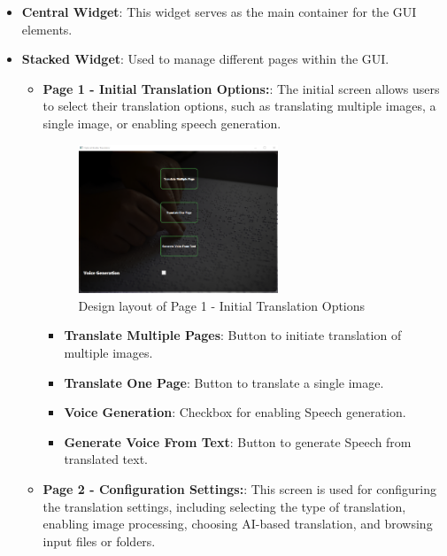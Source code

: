\begin{itemize}
    \item \textbf{Central Widget}: This widget serves as the main container for the GUI elements.
    
    \item \textbf{Stacked Widget}: Used to manage different pages within the GUI.
    
    \begin{itemize}
        \item \textbf{Page 1 - Initial Translation Options:}: The initial screen allows users to select their translation options, such as translating multiple images, a single image, or enabling speech generation.

        \begin{figure}[h!]
            \centering
            \includegraphics[width=0.6\textwidth]{main_page.png}
            \caption{Design layout of Page 1 - Initial Translation Options}
        \end{figure}
        
        \begin{itemize}
            \item \textbf{Translate Multiple Pages}: Button to initiate translation of multiple images.
            \item \textbf{Translate One Page}: Button to translate a single image.
            \item \textbf{Voice Generation}: Checkbox for enabling Speech generation.
            \item \textbf{Generate Voice From Text}: Button to generate Speech from translated text.
        \end{itemize}
        
        \item \textbf{Page 2 - Configuration Settings:}: This screen is used for configuring the translation settings, including selecting the type of translation, enabling image processing, choosing AI-based translation, and browsing input files or folders.


\end{itemize}
\end{itemize}
